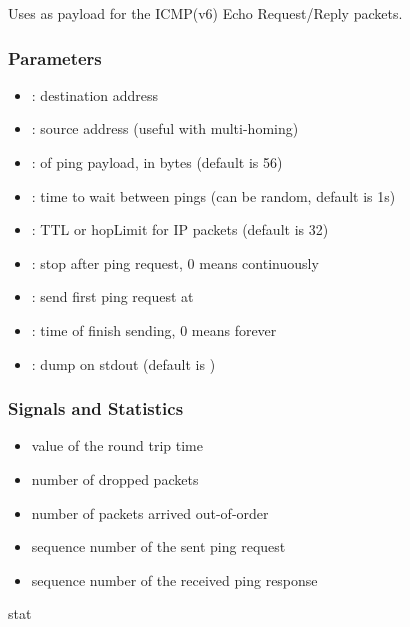 Uses  as payload for the ICMP(v6) Echo Request/Reply packets.

\subsubsection*{Parameters}

\begin{itemize}
  \item {}: destination address
  \item {}: source address (useful with multi-homing)
  \item {}: of ping payload, in bytes (default is 56)
  \item {}: time to wait between pings (can be random, default is 1s)
  \item {}: TTL or hopLimit for IP packets (default is 32)
  \item {}: stop after  ping request, 0 means continuously
  \item {}: send first ping request at 
  \item {}: time of finish sending, 0 means forever
  \item {}: dump on stdout (default is )
\end{itemize}

\subsubsection*{Signals and Statistics}

\begin{itemize}
  \item {} value of the round trip time
  \item {} number of dropped packets
  \item {} number of packets arrived out-of-order
  \item {} sequence number of the sent ping request
  \item {} sequence number of the received ping response
\end{itemize}

 stat



